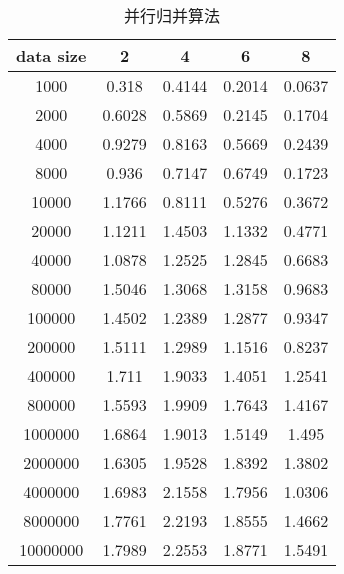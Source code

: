 \documentclass{zjureport-zh}
\begin{document}
\begin{table}[h]
\centering
\caption{并行归并算法}
\vspace{1ex}
\begin{tabular}{|c|c|c|c|c|}
        \hline
        data size & 2 & 4 & 6 & 8 \\
        \hline
        1000 & 0.318 & 0.4144 & 0.2014 & 0.0637 \\
        \hline
        2000 & 0.6028 & 0.5869 & 0.2145 & 0.1704 \\
        \hline
        4000 & 0.9279 & 0.8163 & 0.5669 & 0.2439 \\
        \hline
        8000 & 0.936 & 0.7147 & 0.6749 & 0.1723 \\
        \hline
        10000 & 1.1766 & 0.8111 & 0.5276 & 0.3672 \\
        \hline
        20000 & 1.1211 & 1.4503 & 1.1332 & 0.4771 \\
        \hline
        40000 & 1.0878 & 1.2525 & 1.2845 & 0.6683 \\
        \hline
        80000 & 1.5046 & 1.3068 & 1.3158 & 0.9683 \\
        \hline
        100000 & 1.4502 & 1.2389 & 1.2877 & 0.9347 \\
        \hline
        200000 & 1.5111 & 1.2989 & 1.1516 & 0.8237 \\
        \hline
        400000 & 1.711 & 1.9033 & 1.4051 & 1.2541 \\
        \hline
        800000 & 1.5593 & 1.9909 & 1.7643 & 1.4167 \\
        \hline
        1000000 & 1.6864 & 1.9013 & 1.5149 & 1.495 \\
        \hline
        2000000 & 1.6305 & 1.9528 & 1.8392 & 1.3802 \\
        \hline
        4000000 & 1.6983 & 2.1558 & 1.7956 & 1.0306 \\
        \hline
        8000000 & 1.7761 & 2.2193 & 1.8555 & 1.4662 \\
        \hline
        10000000 & 1.7989 & 2.2553 & 1.8771 & 1.5491 \\
        \hline
\end{tabular}
\end{table}
\end{document}
